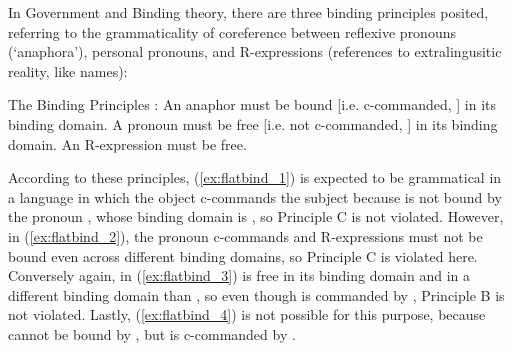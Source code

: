In Government and Binding theory, there are three binding principles posited,
referring to the grammaticality of coreference between reflexive pronouns
(`ana\-phora'), personal pronouns, and R-expressions (references to
extralingusitic reality, like names):

\pex\label{ex:gbprinciples}
	The Binding Principles \citep[157]{carnie2013}:
	\a\label{ex:gb_a}%
		An anaphor must be bound [i.e. c-commanded, \CB] in its binding domain.
	\a\label{ex:gb_b}%
		A pronoun must be free [i.e. not c-commanded, \CB] in its binding
		domain.
	\a\label{ex:gb_c}%
		An R-expression must be free.
\xe



According to these principles, (\ref{ex:flatbind_1}) is expected to be
grammatical in a language in which the object c-commands the subject because
 is not bound by the pronoun , whose binding domain is , so Principle C is not violated. However, in (\ref{ex:flatbind_2}), the
pronoun c-commands  and R-expressions must not be bound even across
different binding domains, so Principle C is violated here. Conversely again,
 in (\ref{ex:flatbind_3}) is free in its binding domain and in a
different binding domain than , so even though  is
commanded by , Principle B is not violated. Lastly,
(\ref{ex:flatbind_4}) is not possible for this purpose, because  cannot
be bound by , but  is c-commanded by .

